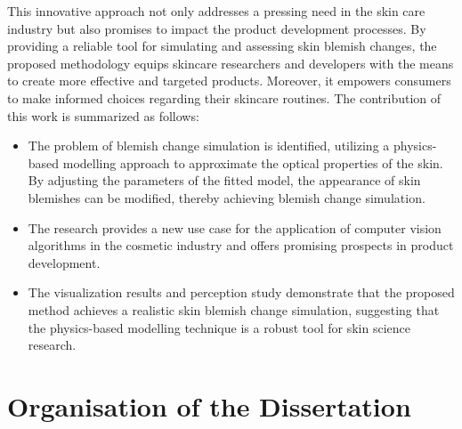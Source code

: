 \begin{spacing}{1.5}
This innovative approach not only addresses a pressing need in the skin care industry but also promises to impact the product development processes. By providing a reliable tool for simulating and assessing skin blemish changes, the proposed methodology equips skincare researchers and developers with the means to create more effective and targeted products. Moreover, it empowers consumers to make informed choices regarding their skincare routines. The contribution of this work is summarized as follows:
\begin{itemize}
    \item The problem of blemish change simulation is identified, utilizing a physics-based modelling approach to approximate the optical properties of the skin. By adjusting the parameters of the fitted model, the appearance of skin blemishes can be modified, thereby achieving blemish change simulation.
    \item The research provides a new use case for the application of computer vision algorithms in the cosmetic industry and offers promising prospects in product development.
    \item The visualization results and perception study demonstrate that the proposed method achieves a realistic skin blemish change simulation, suggesting that the physics-based modelling technique is a robust tool for skin science research.
\end{itemize}

\section{Organisation of the Dissertation}


\end{spacing}
